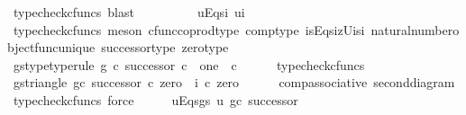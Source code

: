 \begin{isabellebody}
\ {\isacharparenleft}{\kern0pt}typecheck{\isacharunderscore}{\kern0pt}cfuncs{\isacharcomma}{\kern0pt}\ blast{\isacharparenright}{\kern0pt}\ \ \ \ \isanewline
\ \ \isamarkupfalse%
\ \isamarkupfalse%
\ u{\isacharunderscore}{\kern0pt}Eqs{\isacharunderscore}{\kern0pt}i{}{\isacharcolon}{\kern0pt}\ {\isachardoublequoteopen}u{\isacharequal}{\kern0pt}i{}{\isachardoublequoteclose}\isanewline
\ \ \ \ \isamarkupfalse%
\ {\isacharparenleft}{\kern0pt}typecheck{\isacharunderscore}{\kern0pt}cfuncs{\isacharcomma}{\kern0pt}\ meson\ cfunc{\isacharunderscore}{\kern0pt}coprod{\isacharunderscore}{\kern0pt}type\ comp{\isacharunderscore}{\kern0pt}type\ i{}{\isacharunderscore}{\kern0pt}sEqs{\isacharunderscore}{\kern0pt}i{}zUi{}s{\isacharunderscore}{\kern0pt}i{}\ natural{\isacharunderscore}{\kern0pt}number{\isacharunderscore}{\kern0pt}object{\isacharunderscore}{\kern0pt}func{\isacharunderscore}{\kern0pt}unique\ successor{\isacharunderscore}{\kern0pt}type\ zero{\isacharunderscore}{\kern0pt}type{\isacharparenright}{\kern0pt}\isanewline
\ \ \isamarkupfalse%
\ g{\isacharunderscore}{\kern0pt}s{\isacharunderscore}{\kern0pt}type{\isacharbrackleft}{\kern0pt}type{\isacharunderscore}{\kern0pt}rule{\isacharbrackright}{\kern0pt}{\isacharcolon}{\kern0pt}\ {\isachardoublequoteopen}g\ {\isasymcirc}\isactrlsub c\ successor{\isacharcolon}{\kern0pt}\ {\isasymnat}\isactrlsub c\ {\isasymrightarrow}\ {\isacharparenleft}{\kern0pt}one\ {\isasymCoprod}\ {\isasymnat}\isactrlsub c{\isacharparenright}{\kern0pt}{\isachardoublequoteclose}\isanewline
\ \ \ \ \isamarkupfalse%
\ typecheck{\isacharunderscore}{\kern0pt}cfuncs\isanewline
\ \ \isamarkupfalse%
\ g{\isacharunderscore}{\kern0pt}s{\isacharunderscore}{\kern0pt}triangle{\isacharcolon}{\kern0pt}\ {\isachardoublequoteopen}{\isacharparenleft}{\kern0pt}g{\isasymcirc}\isactrlsub c\ successor{\isacharparenright}{\kern0pt}\ {\isasymcirc}\isactrlsub c\ zero\ {\isacharequal}{\kern0pt}\ i{}\ {\isasymcirc}\isactrlsub c\ zero{\isachardoublequoteclose}\isanewline
\ \ \ \ \isamarkupfalse%
\ comp{\isacharunderscore}{\kern0pt}associative{}\ second{\isacharunderscore}{\kern0pt}diagram{}\ \isamarkupfalse%
\ {\isacharparenleft}{\kern0pt}typecheck{\isacharunderscore}{\kern0pt}cfuncs{\isacharcomma}{\kern0pt}\ force{\isacharparenright}{\kern0pt}\isanewline
\ \ \isamarkupfalse%
\ \isamarkupfalse%
\ u{\isacharunderscore}{\kern0pt}Eqs{\isacharunderscore}{\kern0pt}g{\isacharunderscore}{\kern0pt}s{\isacharcolon}{\kern0pt}\ {\isachardoublequoteopen}u{\isacharequal}{\kern0pt}\ g{\isasymcirc}\isactrlsub c\ successor{\isachardoublequoteclose}\isanewline

\end{isabellebody}
